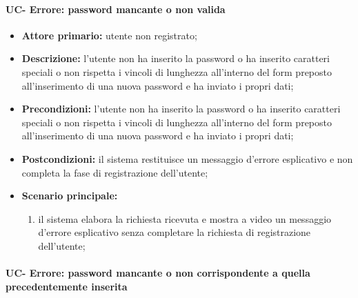 \paragraph{UC- Errore: password mancante o non valida}

	\begin{itemize}
		\item \textbf{Attore primario:} utente non registrato;

		\item \textbf{Descrizione:} l'utente non ha inserito la password o ha inserito caratteri speciali o non rispetta i vincoli di lunghezza all'interno del form preposto all'inserimento di una nuova password e ha inviato i propri dati;

		\item \textbf{Precondizioni:} l'utente non ha inserito la password o ha inserito caratteri speciali o non rispetta i vincoli di lunghezza all'interno del form preposto all'inserimento di una nuova password e ha inviato i propri dati;

		\item \textbf{Postcondizioni:} il sistema restituisce un messaggio d'errore esplicativo e non completa la fase di registrazione dell'utente;

		\item \textbf{Scenario principale:}
	  		\begin{enumerate}
		  		\item il sistema elabora la richiesta ricevuta e mostra a video un messaggio d'errore esplicativo senza completare la richiesta di registrazione dell'utente; 
	  		\end{enumerate}
	\end{itemize}


\paragraph{UC- Errore: password mancante o non corrispondente a quella precedentemente inserita}

